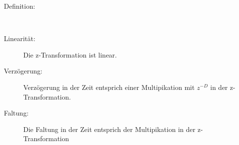 % 
% 
% 
% 
%

\begin{description}
 \item [Definition:]$ $\\[0.2cm]
 \item [Linearität:] Die z-Transformation ist linear.\\[0.2cm]
 \item [Verzögerung:] Verzögerung in der Zeit entsprich einer Multipikation mit $z^{-D}$ in der z-Transformation.\\[0.2cm]
 \item [Faltung:] Die Faltung in der Zeit entsprich der Multipikation in der z-Transformation\\[0.2cm]
\end{description}

